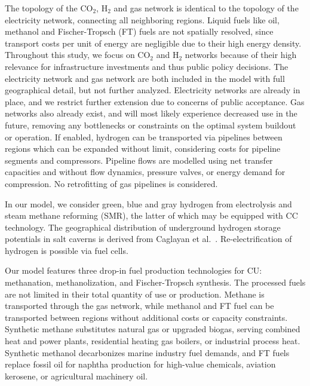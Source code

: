 \documentclass[twocolumn]{article}
\newcommand{\COtwo}{CO$_2$}
\newcommand{\Htwo}{H$_2$}
\begin{document}

The topology of the \COtwo{}, \Htwo{} and gas network is identical to the topology of the electricity network, connecting all neighboring regions. Liquid fuels like oil, methanol and Fischer-Tropsch (FT) fuels are not spatially resolved, since transport costs per unit of energy are negligible due to their high energy density. Throughout this study, we focus on \COtwo{} and \Htwo{} networks because of their high relevance for infrastructure investments and thus public policy decisions. The electricity network and gas network are both included in the model with full geographical detail, but not further analyzed. Electricity networks are already in place, and we restrict further extension due to concerns of public acceptance. Gas networks also already exist, and will most likely experience decreased use in the future, removing any bottlenecks or constraints on the optimal system buildout or operation.
If enabled, hydrogen can be transported via pipelines between regions which can be expanded without limit, considering costs for pipeline segments and compressors. Pipeline flows are modelled using net transfer capacities and without flow dynamics, pressure valves, or energy demand for compression. No retrofitting of gas pipelines is considered.


In our model, we consider green, blue and gray hydrogen from electrolysis and steam methane reforming (SMR), the latter of which may be equipped with CC technology. The geographical distribution of underground hydrogen storage potentials in salt caverns is derived from Caglayan et al.~\cite{caglayanTechnicalPotentialSalt2020}. Re-electrification of hydrogen is possible via fuel cells.



Our model features three drop-in fuel production technologies for CU: methanation, methanolization, and Fischer-Tropsch synthesis.
The processed fuels are not limited in their total quantity of use or production.
Methane is transported through the gas network, while methanol and FT fuel can be transported between regions without additional costs or capacity constraints.
Synthetic methane substitutes natural gas or upgraded biogas, serving combined heat and power plants, residential heating gas boilers, or industrial process heat.
Synthetic methanol decarbonizes marine industry fuel demands, and FT fuels replace fossil oil for naphtha production for high-value chemicals, aviation kerosene, or agricultural machinery oil.
\end{document}
